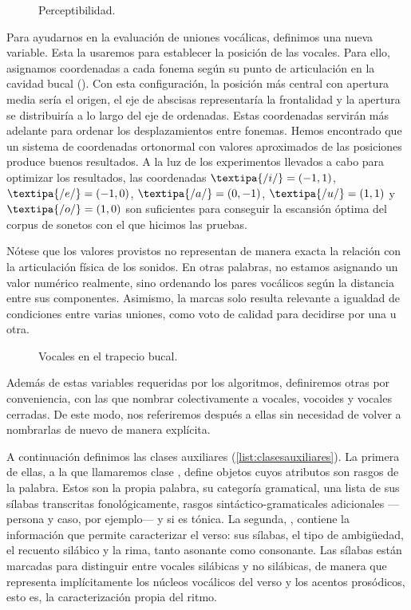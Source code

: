 \begin{figure}[!ht]
\centering
	 
\caption{Perceptibilidad.}
\label{fig:percep}
\end{figure}

Para ayudarnos en la evaluación de uniones vocálicas, definimos una nueva variable. Esta la usaremos para establecer la posición de las vocales. Para ello, asignamos coordenadas a cada fonema según su punto de articulación en la cavidad bucal (). Con esta configuración, la posición más central con apertura media sería el origen, el eje de abscisas representaría la frontalidad y la apertura se distribuiría a lo largo del eje de ordenadas. Estas coordenadas servirán más adelante para ordenar los desplazamientos entre fonemas. Hemos encontrado que un sistema de coordenadas ortonormal con valores aproximados de las posiciones produce buenos resultados. A la luz de los experimentos llevados a cabo para optimizar los resultados, las coordenadas $\textipa{/i/} = (-1, 1)$, $\textipa{/e/} = (-1, 0)$, $\textipa{/a/} = (0, -1)$, $\textipa{/u/} = (1, 1)$ y $\textipa{/o/} = (1, 0)$ son suficientes para conseguir la escansión óptima del corpus de sonetos con el que  hicimos las pruebas.

Nótese que los valores provistos no representan de manera exacta la relación con la articulación física de los sonidos. En otras palabras, no estamos asignando un valor numérico realmente, sino ordenando los pares vocálicos según la distancia entre sus componentes. Asimismo, la marcas solo resulta relevante a igualdad de condiciones entre varias uniones, como voto de calidad para decidirse por una u otra.

\begin{figure}[!ht]
	\centering
	
	\caption{Vocales en el trapecio bucal.}
	\label{fig:trapez}
\end{figure}

Además de estas variables requeridas por los algoritmos, definiremos otras por conveniencia, con las que nombrar colectivamente a vocales, vocoides y vocales cerradas. De este modo, nos referiremos después a ellas sin necesidad de volver a nombrarlas de nuevo de manera explícita.

A continuación definimos las clases auxiliares (\cref{list:clasesauxiliares}). La primera de ellas, a la que llamaremos clase \Valores, define objetos cuyos atributos son rasgos de la palabra. Estos son la propia palabra, su categoría gramatical, una lista de sus sílabas transcritas fonológicamente, rasgos sintáctico-gramaticales adicionales —persona y caso, por ejemplo— y si es tónica. La segunda, \Verso, contiene la información que permite caracterizar el verso: sus sílabas, el tipo de ambigüedad, el recuento silábico y la rima, tanto asonante como consonante. Las sílabas están marcadas para distinguir entre vocales silábicas y no silábicas, de manera que representa implícitamente los núcleos vocálicos del verso y los acentos prosódicos, esto es, la caracterización propia del ritmo.


